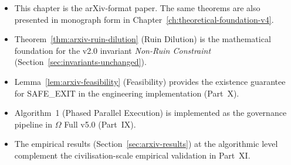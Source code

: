 \begin{itemize}
\item This chapter is the arXiv-format paper. The same theorems are
also presented in monograph form in
Chapter~\ref{ch:theoretical-foundation-v4}.
\item Theorem~\ref{thm:arxiv-ruin-dilution} (Ruin Dilution) is the
mathematical foundation for the v2.0 invariant
\textit{Non-Ruin Constraint}
(Section~\ref{sec:invariants-unchanged}).
\item Lemma~\ref{lem:arxiv-feasibility} (Feasibility) provides the
existence guarantee for SAFE\_EXIT in the engineering implementation
(Part~X).
\item Algorithm~1 (Phased Parallel Execution) is implemented as the
governance pipeline in $\Omega$ Full v5.0 (Part~IX).
\item The empirical results
(Section~\ref{sec:arxiv-results}) at the algorithmic level
complement the civilisation-scale empirical validation in Part~XI.
\end{itemize}

